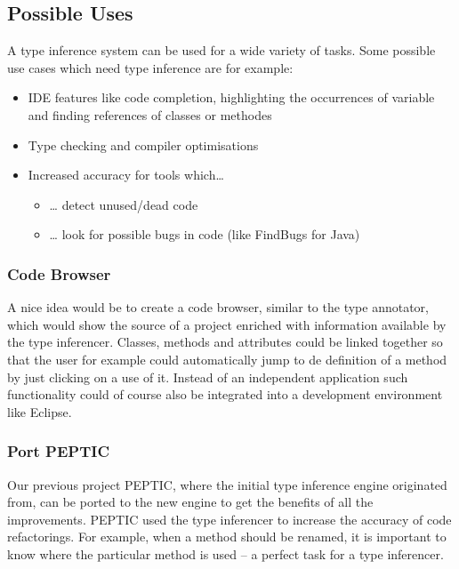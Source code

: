 \documentclass[12pt,halfparskip,DIV11,BCOR10mm]{scrreprt}
\begin{document}
\subsection{Possible Uses}

A type inference system can be used for a wide variety of tasks. Some possible use cases which need type inference are for example:

\begin{itemize}
    \item IDE features like code completion, highlighting the occurrences of variable and finding references of classes or methodes
    \item Type checking and compiler optimisations
    \item Increased accuracy for tools which…
    \begin{itemize}
        \item … detect unused/dead code
        \item … look for possible bugs in code (like FindBugs for Java)
    \end{itemize}  
\end{itemize}

\subsubsection{Code Browser}

A nice idea would be to create a code browser, similar to the type annotator, which would show the source of a project enriched with information available by the type inferencer. Classes, methods and attributes could be linked together so that the user for example could automatically jump to de definition of a method by just clicking on a use of it. Instead of an independent application such functionality could of course also be integrated into a development environment like Eclipse.

\subsubsection{Port PEPTIC}

Our previous project PEPTIC\cite{peptic2}, where the initial type inference engine originated from, can be ported to the new engine to get the benefits of all the improvements. PEPTIC used the type inferencer to increase the accuracy of code refactorings. For example, when a method should be renamed, it is important to know where the particular method is used – a perfect task for a type inferencer.
\end{document}
